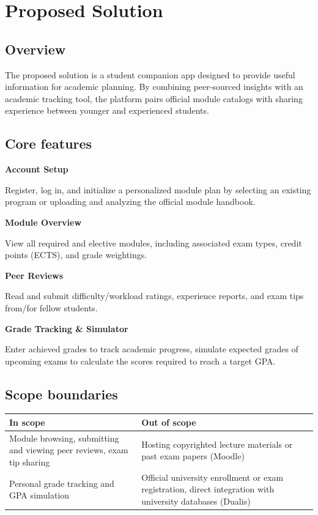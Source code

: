 \documentclass[11pt, a4paper]{article}
\begin{document}
	\section{Proposed Solution}
	\subsection{Overview}
	The proposed solution is a student companion app designed to provide useful information for academic planning. By combining peer-sourced insights with an academic tracking tool, the platform pairs official module catalogs with sharing experience between younger and experienced students.
	
	\clearpage
	\subsection{Core features}

		\textbf{Account Setup}
		
		Register, log in, and initialize a personalized module plan by selecting an existing program or uploading and analyzing the official module handbook.
		
		\textbf{Module Overview}
		
		View all required and elective modules, including associated exam types, credit points (ECTS), and grade weightings.
		
		\textbf{Peer Reviews}
		
		Read and submit difficulty/workload ratings, experience reports, and exam tips from/for fellow students.
		
		\textbf{Grade Tracking \& Simulator} 
		
		Enter achieved grades to track academic progress, simulate expected grades of upcoming exams to calculate the scores required to reach a target GPA.
	
	\subsection{Scope boundaries}
		\begin{tabularx}{\linewidth}{@{} X | X @{}}
		\textbf{In scope} & \textbf{Out of scope} \\
		\toprule
		Module browsing, submitting and viewing peer reviews, exam tip sharing
		&
		Hosting copyrighted lecture materials or past exam papers (Moodle)
		\\
		\midrule
		Personal grade tracking and GPA simulation
		&
		Official university enrollment or exam registration, direct integration with university databases (Dualis)
	\end{tabularx}
	
\end{document}
